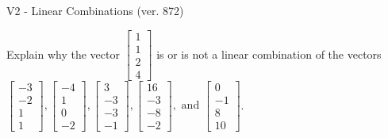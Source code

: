\begin{exercise}
  \begin{exerciseTitle}V2 - Linear Combinations (ver. 872)\end{exerciseTitle}
  \begin{exerciseStatement}
    Explain why the vector \(\left[\begin{array}{c}
1 \\
1 \\
2 \\
4
\end{array}\right]\)  is or is not a linear 
	combination of the vectors \(\left[\begin{array}{c}
-3 \\
-2 \\
1 \\
1
\end{array}\right] , \left[\begin{array}{c}
-4 \\
1 \\
0 \\
-2
\end{array}\right] , \left[\begin{array}{c}
3 \\
-3 \\
-3 \\
-1
\end{array}\right] , \left[\begin{array}{c}
16 \\
-3 \\
-8 \\
-2
\end{array}\right] , \text{ and } \left[\begin{array}{c}
0 \\
-1 \\
8 \\
10
\end{array}\right]\).
	



\end{exerciseStatement}
\end{exercise}
